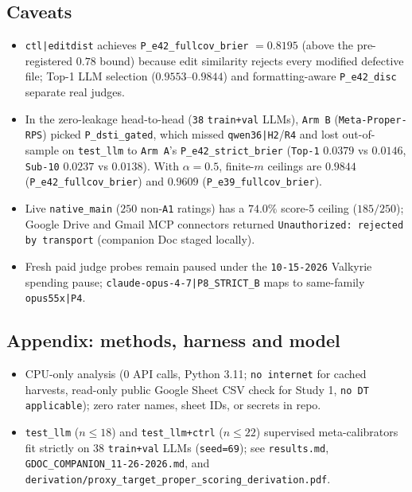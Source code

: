 \subsection*{Caveats}
\begin{itemize}
  \item \texttt{ctl|editdist} achieves \texttt{P\_e42\_fullcov\_brier} $= 0.8195$ (above the pre-registered $0.78$ bound) because edit similarity rejects every modified defective file; Top-1 LLM selection ($0.9553$--$0.9844$) and formatting-aware \texttt{P\_e42\_disc} separate real judges.
  \item In the zero-leakage head-to-head (\texttt{38} \texttt{train+val} LLMs), \texttt{Arm B} (\texttt{Meta-Proper-RPS}) picked \texttt{P\_dsti\_gated}, which missed \texttt{qwen36|H2}/\texttt{R4} and lost out-of-sample on \texttt{test\_llm} to \texttt{Arm A}'s \texttt{P\_e42\_strict\_brier} (\texttt{Top-1} $0.0379$ vs $0.0146$, \texttt{Sub-10} $0.0237$ vs $0.0138$). With $\alpha = 0.5$, finite-$m$ ceilings are $0.9844$ (\texttt{P\_e42\_fullcov\_brier}) and $0.9609$ (\texttt{P\_e39\_fullcov\_brier}).
  \item Live \texttt{native\_main} ($250$ non-\texttt{A1} ratings) has a $74.0\%$ score-5 ceiling ($185/250$); Google Drive and Gmail MCP connectors returned \texttt{Unauthorized: rejected by transport} (companion Doc staged locally).
  \item Fresh paid judge probes remain paused under the \texttt{10-15-2026} Valkyrie spending pause; \texttt{claude-opus-4-7|P8\_STRICT\_B} maps to same-family \texttt{opus55x|P4}.
\end{itemize}

\subsection*{Appendix: methods, harness and model}
\begin{itemize}
  \item CPU-only analysis ($0$ API calls, Python 3.11; \texttt{no internet} for cached harvests, read-only public Google Sheet CSV check for Study 1, \texttt{no DT applicable}); zero rater names, sheet IDs, or secrets in repo.
  \item \texttt{test\_llm} ($n \le 18$) and \texttt{test\_llm+ctrl} ($n \le 22$) supervised meta-calibrators fit strictly on $38$ \texttt{train+val} LLMs (\texttt{seed=69}); see \texttt{results.md}, \texttt{GDOC\_COMPANION\_11-26-2026.md}, and \texttt{derivation/proxy\_target\_proper\_scoring\_derivation.pdf}.
\end{itemize}
